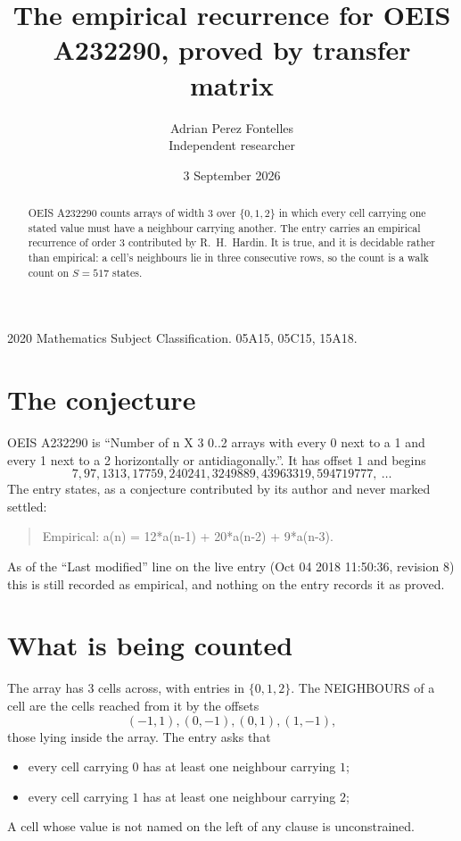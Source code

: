 \documentclass[11pt,a4paper]{article}
\title{The empirical recurrence for OEIS A232290, proved by transfer matrix}
\author{Adrian Perez Fontelles\\ \small Independent researcher}
\date{3 September 2026}
\theoremstyle{plain}
\theoremstyle{definition}
\begin{document}
\maketitle

\begin{abstract}
OEIS A232290 counts arrays of width $3$ over $\{0,1,2\}$ in which every cell carrying one stated
value must have a neighbour carrying another. The entry carries an empirical recurrence of
order $3$ contributed by R.~H.~Hardin. It is true, and it is decidable rather than
empirical: a cell's neighbours lie in three consecutive rows, so the count is a walk count on
$S=517$ states.
\end{abstract}

\noindent\small 2020 Mathematics Subject Classification. 05A15, 05C15, 15A18.\normalsize

\section{The conjecture}

OEIS A232290 is ``Number of n X 3 0..2 arrays with every 0 next to a 1 and every 1 next to a 2 horizontally or antidiagonally.''. It has offset $1$ and begins
\[
7, 97, 1313, 17759, 240241, 3249889, 43963319, 594719777,\ \dots
\]
The entry states, as a conjecture contributed by its author and never marked settled:
\begin{quote}
Empirical: a(n) = 12*a(n-1) + 20*a(n-2) + 9*a(n-3).
\end{quote}
As of the ``Last modified'' line on the live entry (Oct 04 2018 11:50:36, revision 8) this is still
recorded as empirical, and nothing on the entry records it as proved.

\section{What is being counted}

The array has $3$ cells across, with entries in $\{0,1,2\}$. The NEIGHBOURS of a cell are the
cells reached from it by the offsets
\[
(-1,1), (0,-1), (0,1), (1,-1),
\]
those lying inside the array. The entry asks that
\begin{itemize}
\item every cell carrying $0$ has at least one neighbour carrying $1$;
\item every cell carrying $1$ has at least one neighbour carrying $2$;

\end{itemize}
A cell whose value is not named on the left of any clause is unconstrained.
\end{document}
